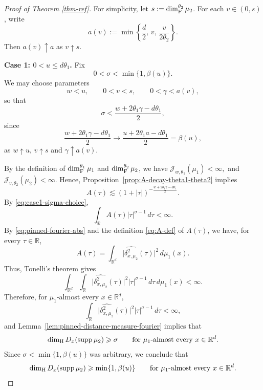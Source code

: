 \documentclass[11pt]{amsart}
\numberwithin{equation}{section}
\renewcommand{\ge}{\geqslant}
\renewcommand{\le}{\leqslant}
\newcommand{\hd}{\dim_{\textup{H}}}
\newcommand{\J}{\mathcal{J}}
\theoremstyle{plain}
\theoremstyle{remark}
\newcommand{\R}{\mathbb{R}}
\newcommand{\Rd}{\mathbb{R}^d}
\newcommand{\supp}{\operatorname{supp}}
\begin{document}
\begin{proof}[Proof of Theorem \ref{thm-ref}]
For simplicity, let $s:=\dim_\textup{F}^{\theta_2} \mu_2$. For each $v\in(0,s)$, write
\[
a(v):=\min\!\left\{\frac d2,\,v,\,\frac{v}{2\theta_2}\right\}.
\]
Then $a(v)\uparrow a$ as $v\uparrow s$.

\smallskip
\noindent
\textbf{Case 1: $0<u\le d\theta_1$.}
Fix
\[
0<\sigma<\min\{1,\beta(u)\}.
\]
We may choose parameters
\[w<u, \qquad
0<v<s,
\qquad
0<\gamma<a(v),
\]
so that
\begin{equation}\label{eq:case1-sigma-choice}
\sigma<\frac{w+2\theta_1\gamma-d\theta_1}{2},
\end{equation}
since
\[
\frac{w+2\theta_1\gamma-d\theta_1}{2}
\longrightarrow
\frac{u+2\theta_1 a-d\theta_1}{2}=\beta(u),
\]
as $w\uparrow u$, $v\uparrow s$ and $\gamma\uparrow a(v)$.

By the definition of $\dim_\textup{F}^{\theta_1} \mu_1$ and $\dim_\textup{F}^{\theta_2} \mu_2$, we have
$
\J_{w,\theta_1}(\mu_1)<\infty,
$
and 
$
\J_{v,\theta_2}(\mu_2)<\infty.
$
Hence, Proposition~\ref{prop:A-decay-theta1-theta2} implies
\[
A(\tau)\lesssim (1+|\tau|)^{-\frac{w+2\theta_1\gamma-d\theta_1}{2}}.
\]
By \eqref{eq:case1-sigma-choice},
\[
\int_{\R}A(\tau)|\tau|^{\sigma-1}\,d\tau<\infty.
\]
By \eqref{eq:pinned-fourier-abs} and the definition \eqref{eq:A-def} of $A(\tau)$, we have, for every $\tau\in\R$,
\begin{equation}\label{eq:A-as-pinned-average}
A(\tau)=\int_{\Rd}\bigl|\widehat{\delta_{x,\mu_2}^2}(\tau)\bigr|^2\,d\mu_1(x).
\end{equation}
Thus, Tonelli's theorem gives
\[
\int_{\Rd}\int_{\R}\bigl|\widehat{\delta_{x,\mu_2}^2}(\tau)\bigr|^2|\tau|^{\sigma-1}\,d\tau\,d\mu_1(x)<\infty.
\]
Therefore, for $\mu_1$-almost every $x\in\Rd$,
\[
\int_{\R}\bigl|\widehat{\delta_{x,\mu_2}^2}(\tau)\bigr|^2|\tau|^{\sigma-1}\,d\tau<\infty,
\]
and Lemma~\ref{lem:pinned-distance-measure-fourier} implies that
\[
\hd D_x(\supp\mu_2)\ge \sigma
\qquad\text{for $\mu_1$-almost every }x\in\Rd.
\]
Since $\sigma<\min\{1,\beta(u)\}$ was arbitrary, we conclude that
\[
\hd D_x(\supp\mu_2)\ge \min\{1,\beta(u)\}
\qquad\text{for $\mu_1$-almost every }x\in\Rd.
\]


\end{proof}
\end{document}
